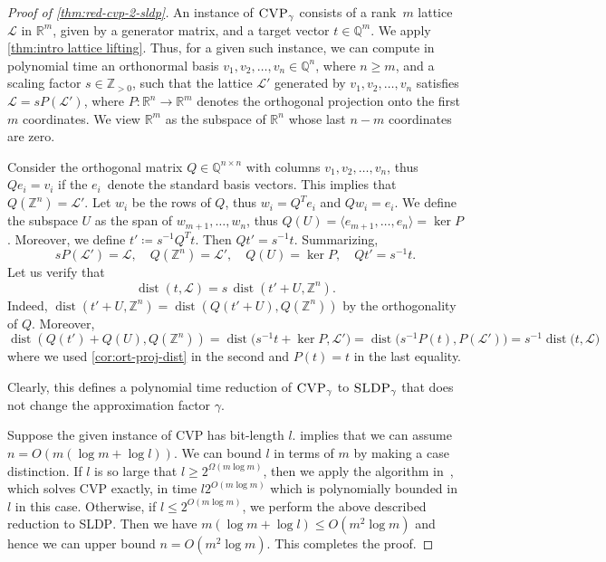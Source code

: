 \documentclass[10pt,a4paper]{article}
\theoremstyle{definition}
\DeclareMathOperator{\dist}{dist}
\newcommand{\QQ}{\mathbb{Q}}
\newcommand{\ZZ}{\mathbb{Z}}
\newcommand{\RR}{\mathbb{R}}
\numberwithin{equation}{section}
\begin{document}
\begin{proof}[Proof of \cref{thm:red-cvp-2-sldp}]
An instance of $\textsc{CVP}_\gamma$
consists of a rank~$m$ lattice $\mathcal{L}$ in $\RR^m$, given by a generator matrix,
and a target vector $t\in\QQ^m$.
We apply \cref{thm:intro lattice lifting}.
Thus, for a given such instance,
we can compute in polynomial time
an orthonormal basis $v_1,v_2,\dots,v_n\in\QQ^n$, where
$n\geq m$, and a scaling factor $s\in\ZZ_{>0}$, such that
the lattice $\mathcal{L}'$ generated by $v_1,v_2,\dots,v_n$
satisfies
$\mathcal{L} = s P(\mathcal{L}')$,
where $P\colon\RR^n\to\RR^m$ denotes the orthogonal projection
onto the first $m$ coordinates. We view $\RR^m$ as the subspace of $\RR^n$ whose last $n-m$ coordinates are zero.

Consider the orthogonal matrix $Q\in\QQ^{n\times n}$ with columns $v_1,v_2,\dots,v_n$,
thus $Q e_i = v_i$ if the $e_i$~denote the standard basis vectors.
This implies that $Q(\ZZ^n)=\mathcal{L}'$.
Let $w_i$ be the rows of $Q$, thus $w_i = Q^T e_i$ and $Qw_i= e_i$.
We define the subspace $U$ as the span of $w_{m+1},\ldots,w_n$,
thus $Q(U)= \langle e_{m+1},\ldots, e_{n} \rangle = \ker P$.
Moreover, we define $t'\coloneqq s^{-1} Q^T t$.
Then $Qt' = s^{-1} t$. Summarizing,
$$
  s P(\mathcal{L}') = \mathcal{L}, \quad
 Q(\ZZ^n)=\mathcal{L}', \quad Q(U) =  \ker P, \quad Qt' = s^{-1} t .
$$
Let us verify that
\begin{equation}\label{eq:dist-equality}
	\dist(t,\mathcal{L}) = s\, \dist(t'+U,\ZZ^n) .
\end{equation}
Indeed,
$\dist(t'+U,\ZZ^n) = \dist(Q(t'+U),Q(\ZZ^n))$
by the orthogonality of $Q$. Moreover,
\begin{equation*}
 \dist(Q(t') + Q(U),Q(\ZZ^n)) = \dist \big( s^{-1} t + \ker P, \mathcal{L}' \big)
 = \dist \big(  s^{-1} P( t),  P(\mathcal{L}') \big)
= s^{-1}  \dist \big( t , \mathcal{L} \big)
\end{equation*}
where we used \cref{cor:ort-proj-dist} in the second and $P(t)=t$ in the last equality.

Clearly, this defines a polynomial time reduction of
$\textsc{CVP}_{\gamma}$ to $\textsc{SLDP}_{\gamma}$
that does not change the approximation factor $\gamma$.

Suppose the given instance of \textsc{CVP} has bit-length $l$.
 implies that we can assume
$n=O(m (\log m +\log l))$.
We can bound $l$ in terms of $m$ by making
a case distinction.
If $l$ is so large that
$l \ge 2^{\Omega(m\log m)}$,
then we apply the algorithm in~\cite{kannan1987},
which solves \textsc{CVP} exactly, in time
$l2^{O(m\log m)}$ which is polynomially bounded in $l$ in this case.
Otherwise, if $l \le 2^{O(m\log m)}$, we perform the above described
reduction to \textsc{SLDP}. Then we have
$m(\log m +\log l) \le O(m^2 \log m)$ and hence
we can upper bound $n= O(m^2 \log m)$.
This completes the proof.
\end{proof}
\end{document}
